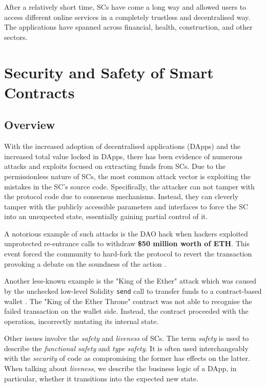 \documentclass[oneside]{ecsproject}     %
\begin{document}
After a relatively short time, SCs have come a long way and allowed users to access different online services in a completely trustless and decentralised way.
The applications have spanned across financial, health, construction\cite{cad_blockchain}, and other sectors. 

\chapter{Security and Safety of Smart Contracts}

\section{Overview}

With the increased adoption of decentralised applications (DApps) and the increased total value locked in DApps, 
there has been evidence of numerous attacks and exploits focused on extracting funds from SCs. 
Due to the permissionless nature of SCs, the most common attack vector is exploiting the mistakes in the SC's source code.
Specifically, the attacker can not tamper with the protocol code due to consensus mechanisms.
Instead, they can cleverly tamper with the publicly accessible parameters and interfaces to force the SC into an unexpected state, essentially gaining partial control of it.

A notorious example of such attacks is the DAO hack when hackers exploited unprotected re-entrance calls to withdraw \textbf{\$50 million worth of ETH}. 
This event forced the community to hard-fork the protocol to revert the transaction provoking a debate on the soundness of the action \cite{the_dao}.

Another less-known example is the "King of the Ether" attack which was caused by the unchecked low-level Solidity \texttt{send} call to transfer funds to a contract-based wallet \cite{king_of_the_ether}.
The "King of the Ether Throne" contract was not able to recognise the failed transaction on the wallet side. Instead, the contract proceeded with the operation, incorrectly mutating its internal state.

Other issues involve the \textit{safety} and \textit{liveness} of SCs. 
The term \textit{safety} is used to describe the \textit{functional safety} and \textit{type safety}. It is often used interchangeably with the \textit{security} of code
as compromising the former has effects on the latter. When talking about \textit{liveness}, we describe the business logic of a DApp, in particular, whether it transitions into the expected new state.
\end{document}
